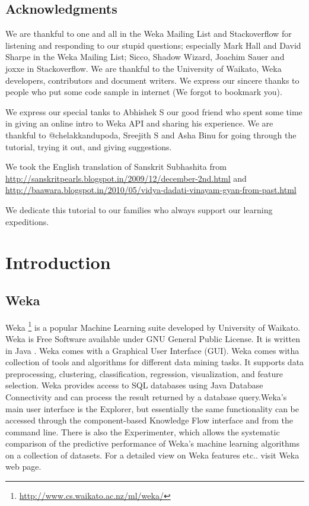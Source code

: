 \documentclass[a4paper,serif,12pt]{report}
\begin{document}
\section*{Acknowledgments}
We are thankful to one and all in the Weka Mailing List and Stackoverflow for listening and responding to our stupid questions; especially Mark Hall and David Sharpe in the Weka Mailing List; Sicco, Shadow Wizard, Joachim Sauer and joxxe in Stackoverflow. We are thankful to the University of Waikato, Weka developers, contributors and document writers. We express our sincere thanks to people who put some code sample in internet (We forgot to bookmark you). 


We express our special tanks to Abhishek S our good friend who spent some time in giving an online intro to Weka API and sharing his experience.  We are thankful to @chelakkandupoda, Sreejith S and Asha Binu for going through the tutorial, trying it out, and giving suggestions.


We took the English translation of Sanskrit Subhashita from \url{http://sanskritpearls.blogspot.in/2009/12/december-2nd.html} and \url{http://baawara.blogspot.in/2010/05/vidya-dadati-vinayam-gyan-from-past.html}


We dedicate this tutorial to our families who always support our learning expeditions. 

\pagebreak 
\tableofcontents
\chapter{Introduction}

\section{Weka}
Weka  \footnote{\url{http://www.cs.waikato.ac.nz/ml/weka/}} is a popular Machine Learning  suite developed by University of Waikato.  Weka  is Free Software  available under GNU General Public License.  It is written in Java . Weka comes with a Graphical User Interface (GUI).  Weka comes witha collection of tools and algorithms for different data mining tasks. It supports data preprocessing, clustering, classification, regression, visualization, and feature selection.  Weka provides access to SQL  databases using Java Database Connectivity  and can process the result returned by a database query.Weka's main user interface is the Explorer, but essentially the same functionality can be accessed through the component-based Knowledge Flow interface and from the command line. There is also the Experimenter, which allows the systematic comparison of the predictive performance of Weka's machine learning algorithms on a collection of datasets. For a detailed view on Weka features etc.. visit Weka web page. 
\\
\end{document}
